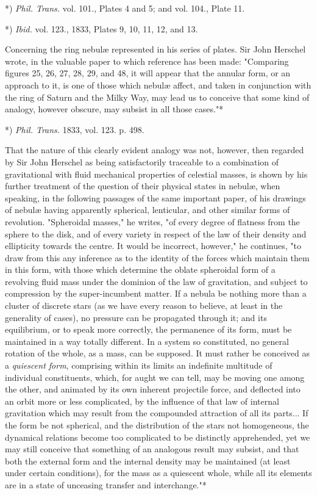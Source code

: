 \documentclass[a4paper, 12pt, oneside, polutonikogreek, english]{article}
\begin{document}
*) \emph{Phil. Trans.} vol. 101., Plates 4 and 5; and vol. 104., Plate 11.

*) \emph{Ibid.} vol. 123., 1833, Plates 9, 10, 11, 12, and 13.

Concerning the ring nebulæ represented in his series of plates. Sir John Herschel wrote, in the valuable paper to which reference has been made: "Comparing figures 25, 26, 27, 28, 29, and 48, it will appear that the annular form, or an approach to it, is one of those which nebulæ affect, and taken in conjunction with the ring of Saturn and the Milky Way, may lead us to conceive that some kind of analogy, however obscure, may subsist in all those cases."*

*) \emph{Phil. Trans.} 1833, vol. 123. p. 498.

That the nature of this clearly evident analogy was not, however, then regarded by Sir John Herschel as being satisfactorily traceable to a combination of gravitational with fluid mechanical properties of celestial masses, is shown by his further treatment of the question of their physical states in nebulæ, when speaking, in the following passages of the same important paper, of his drawings of nebulæ having apparently spherical, lenticular, and other similar forms of revolution. "Spheroidal masses," he writes, "of every degree of flatness from the sphere to the disk, and of every variety in respect of the law of their density and ellipticity towards the centre. It would be incorrect, however," he continues, "to draw from this any inference as to the identity of the forces which maintain them in this form, with those which determine the oblate spheroidal form of a revolving fluid mass under the dominion of the law of gravitation, and subject to compression by the super-incumbent matter. If a nebula be nothing more than a cluster of discrete stars (as we have every reason to believe, at least in the generality of cases), no pressure can be propagated through it; and its equilibrium, or to speak more correctly, the permanence of its form, must be maintained in a way totally different. In a system so constituted, no general rotation of the whole, as a mass, can be supposed. It must rather be conceived as a \emph{quiescent form}, comprising within its limits an indefinite multitude of individual constituents, which, for aught we can tell, may be moving one among the other, and animated by its own inherent projectile force, and deflected into an orbit more or less complicated, by the influence of that law of internal gravitation which may result from the compounded attraction of all its parts... If the form be not spherical, and the distribution of the stars not homogeneous, the dynamical relations become too complicated to be distinctly apprehended, yet we may still conceive that something of an analogous result may subsist, and that both the external form and the internal density may be maintained (at least under certain conditions), for the mass as a quiescent whole, while all its elements are in a state of unceasing transfer and interchange."*
\end{document}
